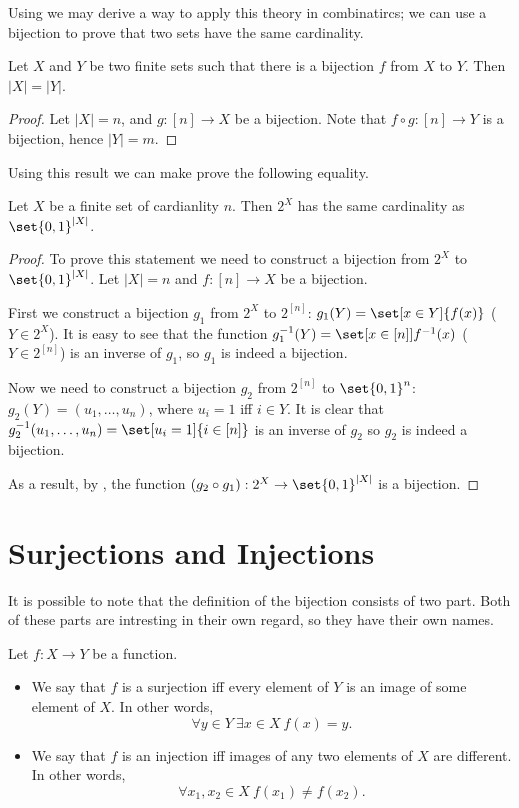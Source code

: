 Using  we may derive a way to apply this
theory in combinatircs; we can use a bijection to prove that two sets have the
same cardinality.
\begin{theorem}
  Let $X$ and $Y$ be two finite sets such that there is a bijection $f$ from
  $X$ to $Y$. Then $|X| = |Y|$.
\end{theorem}
\begin{proof}
  Let $|X| = n$, and $g : [n] \to X$ be a bijection.
  Note that $f \circ g : [n] \to Y$ is a bijection, hence $|Y| = m$.
\end{proof}

Using this result we can make prove the following equality.
\begin{corollary}
  Let $X$ be a finite set of cardianlity $n$. Then $2^X$ has the same
  cardinality as $\set{0, 1}^{|X|}$.
\end{corollary}
\begin{proof}
  To prove this statement we need to construct a bijection from $2^X$ to
  $\set{0, 1}^{|X|}$. Let $|X| = n$ and $f : [n] \to X$ be a bijection.

  First we construct a bijection $g_1$ from $2^X$ to $2^{[n]}$:
  $g_1(Y) = \set[x \in Y]{f(x)}$ ($Y \in 2^X$). It is easy to see that the
  function $g^{-1}_1(Y) = \set[x \in [n]]{f^{-1}(x)}$ ($Y \in 2^{[n]}$) is an
  inverse of $g_1$, so $g_1$ is indeed a bijection.

  Now we need to construct a bijection $g_2$ from $2^{[n]}$ to $\set{0, 1}^n$:
  $g_2(Y) = (u_1, \dots, u_n)$, where $u_i = 1$ iff $i \in Y$. It is clear
  that $g^{-1}_2(u_1, \dots, u_n) = \set[u_i = 1]{i \in [n]}$ is an inverse
  of $g_2$ so $g_2$ is indeed a bijection.

  As a result, by , the function
  $(g_2 \circ g_1) : 2^X \to \set{0, 1}^{|X|}$ is a bijection.
\end{proof}

\section{Surjections and Injections}

It is possible to note that the definition of the bijection consists of two part.
Both of these parts are intresting in their own regard, so they have their own
names.
\begin{definition}
  Let $f : X \to Y$ be a function.
  \begin{itemize}
    \item We say that $f$ is a surjection iff every element of $Y$ is an image
      of some element of $X$. In other words,
      $$
          \forall y \in Y~\exists x \in X\ f(x) = y.
      $$
    \item We say that $f$ is an injection iff images of any two elements
      of $X$ are different. In other words,
      $$
          \forall x_1, x_2 \in X\ f(x_1) \neq f(x_2).
      $$
  \end{itemize}
\end{definition}


